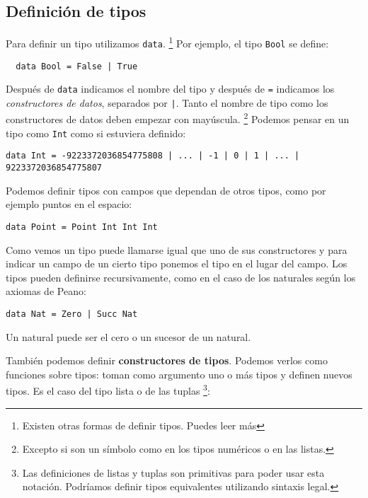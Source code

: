 \subsection{Definición de tipos}
Para definir un tipo utilizamos \texttt{data}. \footnote{Existen otras formas
de definir tipos. Puedes leer más
}
Por ejemplo, el tipo \texttt{Bool} se define:

\begin{lstlisting}
  data Bool = False | True
\end{lstlisting}

Después de \texttt{data} indicamos el nombre del tipo y después de \texttt{=} indicamos los
\textit{constructores de datos}, separados por \texttt{|}. Tanto el nombre de tipo como
los constructores de datos deben empezar con mayúscula. \footnote{Excepto si son un
símbolo como en los tipos numéricos o en las listas.} Podemos pensar en un tipo como
\texttt{Int} como si estuviera definido:

\begin{fullwidth}
\begin{lstlisting}
data Int = -9223372036854775808 | ... | -1 | 0 | 1 | ... | 9223372036854775807
\end{lstlisting}
\end{fullwidth}

Podemos definir tipos con campos que dependan de otros tipos, como por ejemplo
puntos en el espacio:

\begin{lstlisting}
data Point = Point Int Int Int
\end{lstlisting}

Como vemos un tipo puede llamarse igual que uno de sus constructores y
para indicar un campo de un cierto tipo ponemos el tipo en el lugar del campo.
Los tipos pueden definirse recursivamente, como en el caso de los naturales
según los axiomas de Peano:

\begin{lstlisting}
data Nat = Zero | Succ Nat
\end{lstlisting}

Un natural puede ser el cero o un sucesor de un natural.

También podemos definir \textbf{constructores de tipos}. Podemos verlos como
funciones sobre tipos: toman como argumento uno o más tipos y definen nuevos
tipos. Es el caso del tipo lista o de las tuplas
\footnote{Las definiciones de listas y tuplas son primitivas para poder usar
esta notación. Podríamos definir tipos equivalentes utilizando sintaxis legal.}:

